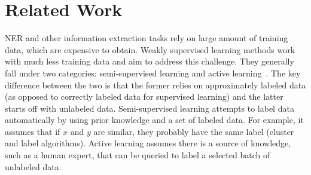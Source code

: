 \section{Related Work}
\label{sect:apner_related}
NER and other information extraction tasks rely on large amount of training data, which are expensive to obtain.
Weakly supervised learning methods work with much less training data and aim to address this challenge.
They generally fall under two categories: semi-supervised learning and active learning~\cite{zhou2017brief}.
The key difference between the two is that the former relies on approximately labeled data (as opposed to correctly labeled data for supervised learning) and the latter starts off with unlabeled data.
Semi-supervised learning attempts to label data automatically by using prior knowledge and a set of labeled data. 
For example, it assumes that if $x$ and $y$ are similar, they probably have the same label (cluster and label algorithms).
Active learning assumes there is a source of knowledge, such as a human expert, that can be queried 
to label a selected batch of unlabeled data. 

